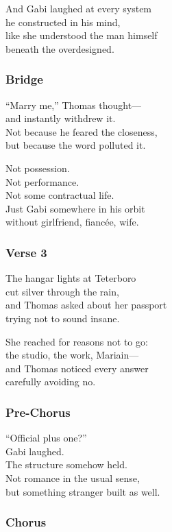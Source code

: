 \documentclass[]{article}
\begin{document}
And Gabi laughed at every system\\
he constructed in his mind,\\
like she understood the man himself\\
beneath the overdesigned.

\subsubsection{Bridge}\label{bridge-4}

``Marry me,'' Thomas thought---\\
and instantly withdrew it.\\
Not because he feared the closeness,\\
but because the word polluted it.

Not possession.\\
Not performance.\\
Not some contractual life.\\
Just Gabi somewhere in his orbit\\
without girlfriend, fiancée, wife.

\subsubsection{Verse 3}\label{verse-3-5}

The hangar lights at Teterboro\\
cut silver through the rain,\\
and Thomas asked about her passport\\
trying not to sound insane.

She reached for reasons not to go:\\
the studio, the work, Mariain---\\
and Thomas noticed every answer\\
carefully avoiding no.

\subsubsection{Pre-Chorus}\label{pre-chorus-11}

``Official plus one?''\\
Gabi laughed.\\
The structure somehow held.\\
Not romance in the usual sense,\\
but something stranger built as well.

\subsubsection{Chorus}\label{chorus-19}
\end{document}
